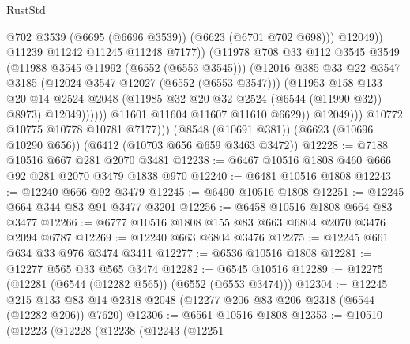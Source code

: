 \begin{lexlean}{RustStd}
\begin{coremodule}
                                    @702
                                    @3539
                                    (@6695 (@6696 @3539))
                                    (@6623 (@6701 @702 @698)))
                                  @12049))
                              @11239
                              @11242
                              @11245
                              @11248
                              @7177))
                          (@11978
                            @708
                            @33
                            @112
                            @3545
                            @3549
                            (@11988 @3545 @11992 (@6552 (@6553 @3545)))
                            (@12016
                              @385
                              @33
                              @22
                              @3547
                              @3185
                              (@12024 @3547 @12027 (@6552 (@6553 @3547)))
                              (@11953
                                @158
                                @133
                                @20
                                @14
                                @2524
                                @2048
                                (@11985 @32 @20 @32 @2524 (@6544 (@11990 @32)) @8973)
                                @12049))))))
                    @11601
                    @11604
                    @11607
                    @11610
                    @6629))
                @12049)))
          @10772
          @10775
          @10778
          @10781
          @7177)))
    (@8548 (@10691 @381))
    (@6623 (@10696 @10290 @656))
    (@6412 (@10703 @656 @659 @3463 @3472))
@12228 := @7188 @10516 @667 @281 @2070 @3481
@12238 := @6467 @10516 @1808 @460 @666 @92 @281 @2070 @3479 @1838 @970
@12240 := @6481 @10516 @1808
@12243 := @12240 @666 @92 @3479
@12245 := @6490 @10516 @1808
@12251 := @12245 @664 @344 @83 @91 @3477 @3201
@12256 := @6458 @10516 @1808 @664 @83 @3477
@12266 := @6777 @10516 @1808 @155 @83 @663 @6804 @2070 @3476 @2094 @6787
@12269 := @12240 @663 @6804 @3476
@12275 := @12245 @661 @634 @33 @976 @3474 @3411
@12277 := @6536 @10516 @1808
@12281 := @12277 @565 @33 @565 @3474
@12282 := @6545 @10516
@12289 := @12275 (@12281 (@6544 (@12282 @565)) (@6552 (@6553 @3474)))
@12304 := @12245
    @215
    @133
    @83
    @14
    @2318
    @2048
    (@12277 @206 @83 @206 @2318 (@6544 (@12282 @206)) @7620)
@12306 := @6561 @10516 @1808
@12353 := @10510
    (@12223
      (@12228
        (@12238
          (@12243
            (@12251

\end{coremodule}
\end{lexlean}

